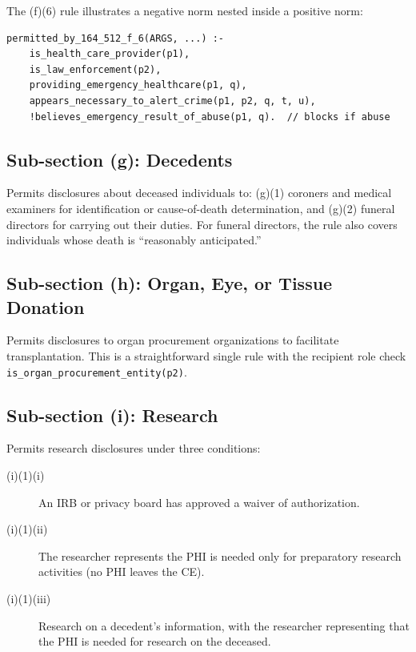 \documentclass[11pt,letterpaper]{article}
\begin{document}
The (f)(6) rule illustrates a negative norm nested inside a positive norm:

\begin{lstlisting}[style=soufflestyle,caption={\S 512(f)(6): Nested negative norm}]
permitted_by_164_512_f_6(ARGS, ...) :-
    is_health_care_provider(p1),
    is_law_enforcement(p2),
    providing_emergency_healthcare(p1, q),
    appears_necessary_to_alert_crime(p1, p2, q, t, u),
    !believes_emergency_result_of_abuse(p1, q).  // blocks if abuse
\end{lstlisting}

\subsection{Sub-section (g): Decedents}

Permits disclosures about deceased individuals to: (g)(1) coroners and medical examiners for identification or cause-of-death determination, and (g)(2) funeral directors for carrying out their duties. For funeral directors, the rule also covers individuals whose death is ``reasonably anticipated.''

\subsection{Sub-section (h): Organ, Eye, or Tissue Donation}

Permits disclosures to organ procurement organizations to facilitate transplantation. This is a straightforward single rule with the recipient role check \texttt{is\_organ\_procurement\_entity(p2)}.

\subsection{Sub-section (i): Research}

Permits research disclosures under three conditions:

\begin{description}
  \item[(i)(1)(i)] An IRB or privacy board has approved a waiver of authorization.
  \item[(i)(1)(ii)] The researcher represents the PHI is needed only for preparatory research activities (no PHI leaves the CE).
  \item[(i)(1)(iii)] Research on a decedent's information, with the researcher representing that the PHI is needed for research on the deceased.
\end{description}
\end{document}
